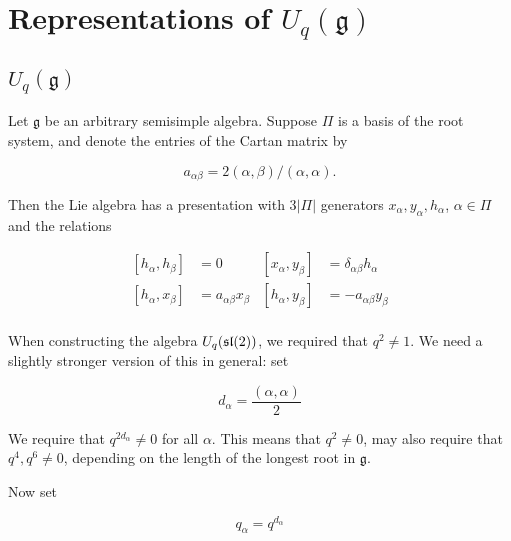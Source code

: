 \section{Representations of $U_q(\mathfrak{g})$}
    \subsection{$U_q(\mathfrak{g})$}


        Let $\mathfrak{g}$ be an arbitrary semisimple algebra. Suppose $\Pi$ is
        a basis of the root system, and denote the entries of the Cartan matrix
        by 

        \begin{equation}
            a_{\alpha\beta} = 2(\alpha, \beta) / (\alpha, \alpha).
        \end{equation}

        Then the Lie algebra has a presentation with $3|\Pi|$ generators
        $x_\alpha, y_\alpha, h_\alpha$, $\alpha \in \Pi$ and the relations 

        \begin{align}
            \left[ h_\alpha, h_\beta \right] &= 0       &   \left[ x_\alpha, y_\beta \right] &= \delta_{\alpha\beta} h_\alpha \\
            \left[ h_\alpha, x_\beta \right] &= a_{\alpha\beta} x_\beta  &   \left[ h_\alpha, y_\beta \right] &= -a_{\alpha\beta} y_\beta \\
        \end{align}

        When constructing the algebra $U_q(\mathfrak{sl}(2))$, we required that $q^2
        \neq 1$. We need a slightly stronger version of this in general: set

        \begin{equation}
            d_\alpha = \frac{(\alpha, \alpha)}{2}
        \end{equation}

        We require that $q^{2d_{\alpha}} \neq 0$ for all $\alpha$. This means
        that $q^2 \neq 0$, may also require that $q^4, q^6 \neq 0$, depending
        on the length of the longest root in $\mathfrak{g}$.

        Now set 

        \begin{equation}
            q_\alpha = q^{d_\alpha}
        \end{equation}


